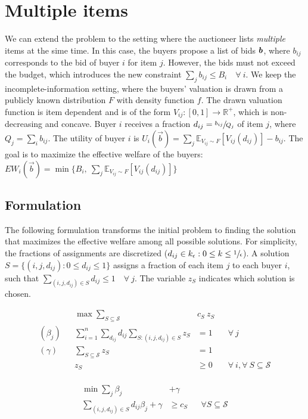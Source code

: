 \section{Multiple items}


We can extend the problem to the setting where the auctioneer lists \emph{multiple} items at the sime time. In this case, the buyers propose a list of bids $\bm{b}$, where $b_{ij}$ corresponds to the bid of buyer $i$ for item $j$. However, the bids must not exceed the budget, which introduces the new constraint $\sum_{j} b_{ij} \le B_i \quad \forall\ i$. We keep the incomplete-information setting, where the buyers' valuation is drawn from a publicly known distribution $F$ with density function $f$. The drawn valuation function is item dependent and is of the form $V_{ij} : [0,1] \rightarrow \mathbb{R}^+$, which is non-decreasing and concave. Buyer $i$ receives a fraction $d_{ij} = \sfrac{b_{ij}}{Q_j}$ of item $j$, where $Q_j = \sum_i b_{ij}$. The utility of buyer $i$ is $U_i(\vec{b}) = \sum_{j} \mathbb{E}_{V_{ij} \sim F}[V_{ij}(d_{ij})] - b_{ij}$. The goal is to maximize the effective welfare of the buyers: $EW_i(\vec{b}) = \min\{B_i,\  \sum_{j} \mathbb{E}_{V_{ij} \sim F}[V_{ij}(d_{ij})]\}$

\subsection{Formulation}

The following formulation transforms the initial problem to finding the solution that maximizes the effective welfare among all possible solutions. For simplicity, the fractions of assignments are discretized ($d_{ij} \in k_{\epsilon} : 0 \le k \le \sfrac{1}{\epsilon}$). A solution $S = \{(i, j, d_{ij}) : 0 \le d_{ij} \le 1\}$ assigns a fraction of each item $j$ to each buyer $i$, such that $\sum_{(i,j,d_{ij}) \in S} d_{ij} \le 1 \quad \forall\ j$. The variable $z_S$ indicates which solution is chosen.

\begin{minipage}[t]{0.59\textwidth}
	\begin{align*}
		&& \max  \sum_{S \subseteq \mathcal{S}} &c_{S}\ z_{S} \\
		(\beta_j) && \sum_{i=1}^{n} \sum_{d_{ij}} d_{ij} \sum_{S: (i,j,d_{ij}) \in S } z_{S} &= 1 & & \forall \ j\\
		(\gamma) && \sum_{S \subseteq \mathcal{S}} z_{S}  &= 1	& & \\
		&& z_{S} &\geq 0 & & \forall\ i, \forall\ S \subseteq \mathcal{S}\\
	\end{align*}
\end{minipage}
\begin{minipage}[t]{0.3\textwidth}
	\begin{align*}
		\min \sum_{j} \beta_j &+ \gamma \\
		\sum_{(i,j,d_{ij}) \in S} d_{ij} \beta_j + \gamma &\geq c_{S}  & & \forall S \subseteq \mathcal{S}\\
\end{align*}
\end{minipage}

